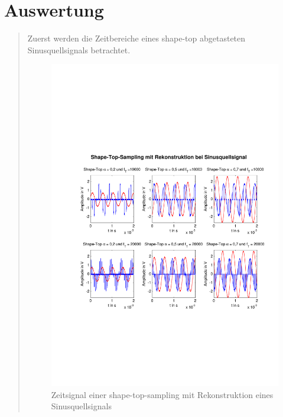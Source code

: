 
    
    \section{Auswertung}
    \begin{quote}    
    
    	Zuerst werden die Zeitbereiche eines shape-top
    	abgetasteten Sinusquellsignals betrachtet.
        
    	\begin{figure}[H]
    \centering
        \includegraphics[scale=0.7, trim = 0cm 0cm 0cm 0cm,
        clip]{./Bilder/shape-top-sinus}
            \caption{Zeitsignal einer shape-top-sampling mit Rekonstruktion
            eines Sinusquellsignals}
  	    \end{figure}
  	    

\end{quote}
